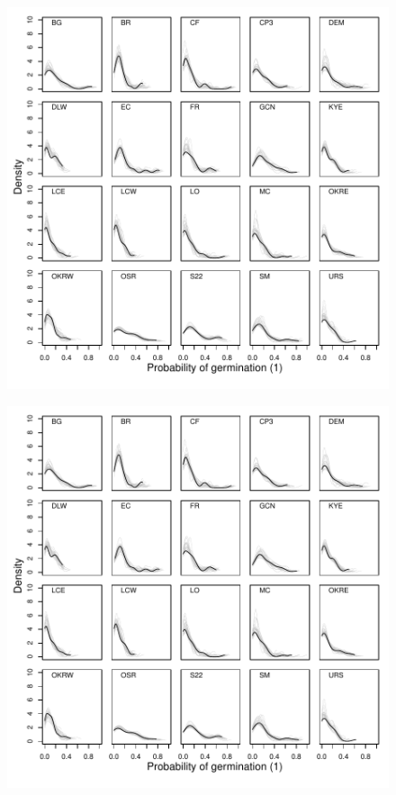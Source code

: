 \documentclass[12pt, oneside, titlepage]{article}   	%
\begin{document}
\begin{figure}[!h]
   \centering
       \includegraphics[page=2,width=1\textwidth]{../../figures/modelChecks/germination-population.pdf}  
 \label{fig:name}
\end{figure}

\begin{figure}[!h]
   \centering
       \includegraphics[page=3,width=1\textwidth]{../../figures/modelChecks/germination-population.pdf}  
 \label{fig:name}
\end{figure}
\end{document}
